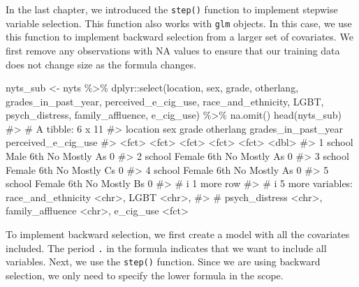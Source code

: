 \documentclass[
  letterpaper,
]{krantz}
\makeatletter
\newenvironment{Shaded}{\begin{snugshade}}{\end{snugshade}}
\newcommand{\CommentTok}[1]{\textcolor[rgb]{0.37,0.37,0.37}{#1}}
\newcommand{\FunctionTok}[1]{\textcolor[rgb]{0.28,0.35,0.67}{#1}}
\newcommand{\NormalTok}[1]{\textcolor[rgb]{0.00,0.23,0.31}{#1}}
\newcommand{\OtherTok}[1]{\textcolor[rgb]{0.00,0.23,0.31}{#1}}
\newcommand{\SpecialCharTok}[1]{\textcolor[rgb]{0.37,0.37,0.37}{#1}}
\newenvironment{kframe}{%
\medskip{}
\setlength{\fboxsep}{.8em}
 \def\at@end@of@kframe{}%
 \ifinner\ifhmode%
  \def\at@end@of@kframe{\end{minipage}}%
  \begin{minipage}{\columnwidth}%
 \fi\fi%
 \def\FrameCommand##1{\hskip\@totalleftmargin \hskip-\fboxsep
 \colorbox{shadecolor}{##1}\hskip-\fboxsep
     \hskip-\linewidth \hskip-\@totalleftmargin \hskip\columnwidth}%
 \MakeFramed {\advance\hsize-\width
   \@totalleftmargin\z@ \linewidth\hsize
   \@setminipage}}%
 {\par\unskip\endMakeFramed%
 \at@end@of@kframe}
\renewenvironment{Shaded}{\begin{kframe}}{\end{kframe}}
\makeatother
\begin{document}
In the last chapter, we introduced the \texttt{step()} function to
implement stepwise variable selection. This function also works with
\texttt{glm} objects. In this case, we use this function to implement
backward selection from a larger set of covariates. We first remove any
observations with NA values to ensure that our training data does not
change size as the formula changes.

\begin{Shaded}
\begin{Highlighting}[]
\NormalTok{nyts\_sub }\OtherTok{\textless{}{-}}\NormalTok{ nyts }\SpecialCharTok{\%\textgreater{}\%} 
\NormalTok{  dplyr}\SpecialCharTok{::}\FunctionTok{select}\NormalTok{(location, sex, grade, otherlang, grades\_in\_past\_year, }
\NormalTok{                perceived\_e\_cig\_use, race\_and\_ethnicity, LGBT, }
\NormalTok{                psych\_distress, family\_affluence, e\_cig\_use) }\SpecialCharTok{\%\textgreater{}\%}
  \FunctionTok{na.omit}\NormalTok{()}
\FunctionTok{head}\NormalTok{(nyts\_sub)}
\CommentTok{\#\textgreater{} \# A tibble: 6 x 11}
\CommentTok{\#\textgreater{}   location sex    grade otherlang grades\_in\_past\_year perceived\_e\_cig\_use}
\CommentTok{\#\textgreater{}   \textless{}fct\textgreater{}    \textless{}fct\textgreater{}  \textless{}fct\textgreater{} \textless{}fct\textgreater{}     \textless{}fct\textgreater{}                             \textless{}dbl\textgreater{}}
\CommentTok{\#\textgreater{} 1 school   Male   6th   No        Mostly A\textquotesingle{}s                            0}
\CommentTok{\#\textgreater{} 2 school   Female 6th   No        Mostly A\textquotesingle{}s                            0}
\CommentTok{\#\textgreater{} 3 school   Female 6th   No        Mostly C\textquotesingle{}s                            0}
\CommentTok{\#\textgreater{} 4 school   Female 6th   No        Mostly A\textquotesingle{}s                            0}
\CommentTok{\#\textgreater{} 5 school   Female 6th   No        Mostly B\textquotesingle{}s                            0}
\CommentTok{\#\textgreater{} \# i 1 more row}
\CommentTok{\#\textgreater{} \# i 5 more variables: race\_and\_ethnicity \textless{}chr\textgreater{}, LGBT \textless{}chr\textgreater{},}
\CommentTok{\#\textgreater{} \#   psych\_distress \textless{}chr\textgreater{}, family\_affluence \textless{}chr\textgreater{}, e\_cig\_use \textless{}fct\textgreater{}}
\end{Highlighting}
\end{Shaded}

To implement backward selection, we first create a model with all the
covariates included. The period \texttt{.} in the formula indicates that
we want to include all variables. Next, we use the \texttt{step()}
function. Since we are using backward selection, we only need to specify
the lower formula in the scope.
\end{document}
